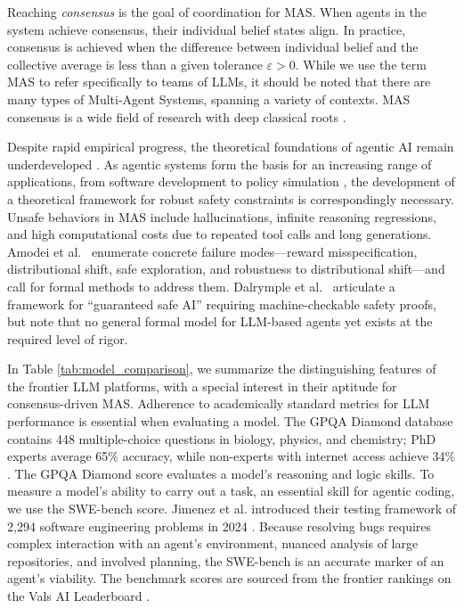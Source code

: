 \documentclass[journal,twoside,web]{ieeecolor_no_firstpage_logo}
\begin{document}
Reaching \textit{consensus} is the goal of coordination for MAS. When agents in the system achieve consensus, their individual belief states align. In practice, consensus is achieved when the difference between individual belief and the collective average is less than a given tolerance $\varepsilon >0.$ While we use the term MAS to refer specifically to teams of LLMs, it should be noted that there are many types of Multi-Agent Systems, spanning a variety of contexts. MAS consensus is a wide field of research with deep classical roots %
\cite{bib19,bib20,bib21}. 

Despite rapid empirical progress, the theoretical foundations of agentic AI remain underdeveloped \cite{bib22,bib23,bib24}. As agentic systems form the basis for an increasing range of applications, from software development to policy simulation \cite{bib28}, the development of a theoretical framework for robust safety constraints is correspondingly necessary. Unsafe behaviors in MAS include hallucinations, infinite reasoning regressions, and high computational costs due to repeated tool calls and long generations. 
Amodei et al.~\cite{bib29} enumerate concrete failure
modes---reward misspecification, distributional shift, safe
exploration, and robustness to distributional shift---and call for
formal methods to address them.
Dalrymple et al.~\cite{bib30} articulate a framework
for ``guaranteed safe AI'' requiring machine-checkable safety proofs,
but note that no general formal model for LLM-based agents yet exists
at the required level of rigor.


In Table \ref{tab:model_comparison}, we summarize the distinguishing features of the frontier LLM platforms, with a special interest in their aptitude for consensus-driven MAS. Adherence to academically standard metrics for LLM performance is essential when evaluating a model. The GPQA Diamond database contains 448 multiple-choice questions in biology, physics, and chemistry; PhD experts average 65\% accuracy, while non-experts with internet access achieve 34\% \cite{bib25}. The GPQA Diamond score evaluates a model's reasoning and logic skills. To measure a model's ability to carry out a task, an essential skill for agentic coding, we use the SWE-bench score. Jimenez et al. introduced their testing framework of 2,294 software engineering problems in 2024 \cite{bib26}. Because resolving bugs requires complex interaction with an agent's environment, nuanced analysis of large repositories, and involved planning, the SWE-bench is an accurate marker of an agent's viability. The benchmark scores are sourced from the frontier rankings on the Vals AI Leaderboard \cite{bib27}. 
\end{document}

